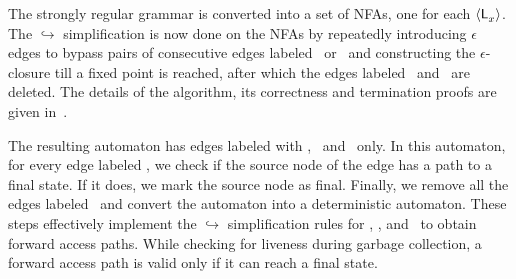 The strongly regular grammar is converted  into a set of NFAs, one for
each $\langle \mathsf{L}_{{x}}^{}\rangle$.  The  $\hookrightarrow$ simplification is now
done on the NFAs by  repeatedly introducing $\epsilon$ edges to bypass
pairs  of consecutive  edges  labeled \bcar\acar\  or \bcdr\acdr\  and
constructing  the $\epsilon$-closure  till a  fixed point  is reached,
after which  the edges labeled  \bcar \  and \bcdr\ are  deleted.  The
details of the  algorithm, its correctness and  termination proofs are
given in~\cite{karkare07liveness,asati14lgc}.

The resulting automaton has edges labeled with \acar, \acdr\ and
\clazy\ only.  In this  automaton, for every  edge labeled  \clazy, we
check if the source node of the edge  has a path to a final state.  If
it does, we mark the source node  as final. Finally, we remove all the
edges labeled \clazy\  and convert the automaton  into a deterministic
automaton.   These steps  effectively implement  the $\hookrightarrow$
simplification rules for \bcar, \bcdr, and
\clazy\ to  obtain forward access paths.  While checking for  liveness during
garbage collection,  a forward  access path  is valid  only if  it can
reach a final state.


